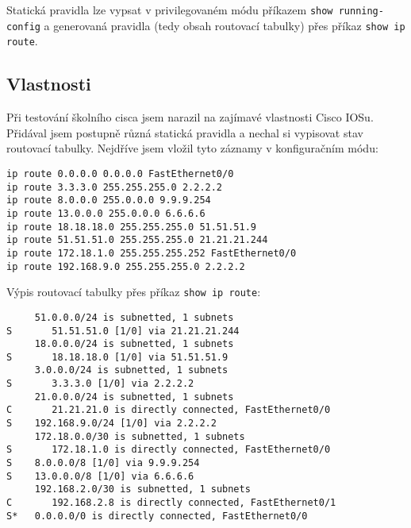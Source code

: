 Statická pravidla lze vypsat v privilegovaném módu příkazem \verb|show running-config| a generovaná pravidla (tedy obsah routovací tabulky) přes příkaz \verb|show ip route|.

\subsection{Vlastnosti}
Při testování školního cisca jsem narazil na zajímavé vlastnosti Cisco IOSu. Přidával jsem postupně různá statická pravidla a nechal si vypisovat stav routovací tabulky.
Nejdříve jsem vložil tyto záznamy v konfiguračním módu:
\begin{verbatim}
ip route 0.0.0.0 0.0.0.0 FastEthernet0/0
ip route 3.3.3.0 255.255.255.0 2.2.2.2
ip route 8.0.0.0 255.0.0.0 9.9.9.254
ip route 13.0.0.0 255.0.0.0 6.6.6.6
ip route 18.18.18.0 255.255.255.0 51.51.51.9
ip route 51.51.51.0 255.255.255.0 21.21.21.244
ip route 172.18.1.0 255.255.255.252 FastEthernet0/0
ip route 192.168.9.0 255.255.255.0 2.2.2.2
\end{verbatim}

Výpis routovací tabulky přes příkaz \verb|show ip route|:
\begin{verbatim}
     51.0.0.0/24 is subnetted, 1 subnets
S       51.51.51.0 [1/0] via 21.21.21.244
     18.0.0.0/24 is subnetted, 1 subnets
S       18.18.18.0 [1/0] via 51.51.51.9
     3.0.0.0/24 is subnetted, 1 subnets
S       3.3.3.0 [1/0] via 2.2.2.2
     21.0.0.0/24 is subnetted, 1 subnets
C       21.21.21.0 is directly connected, FastEthernet0/0
S    192.168.9.0/24 [1/0] via 2.2.2.2
     172.18.0.0/30 is subnetted, 1 subnets
S       172.18.1.0 is directly connected, FastEthernet0/0
S    8.0.0.0/8 [1/0] via 9.9.9.254
S    13.0.0.0/8 [1/0] via 6.6.6.6
     192.168.2.0/30 is subnetted, 1 subnets
C       192.168.2.8 is directly connected, FastEthernet0/1
S*   0.0.0.0/0 is directly connected, FastEthernet0/0
\end{verbatim} 

